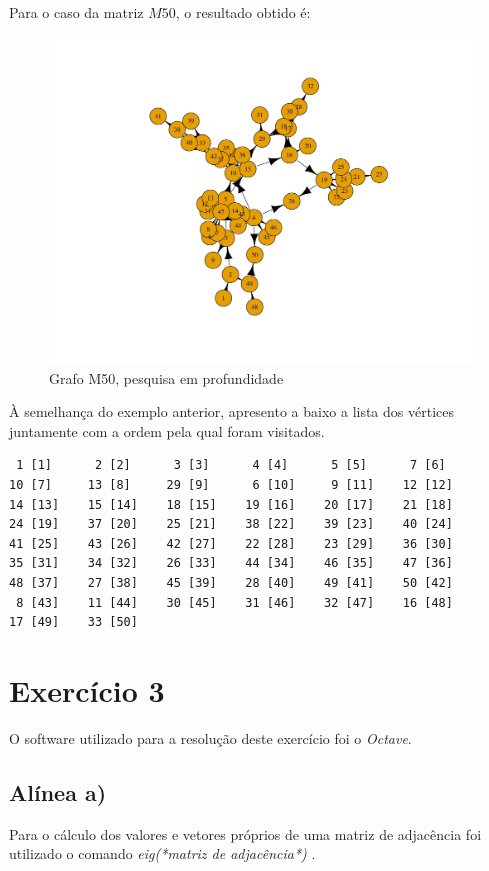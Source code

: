 \documentclass[a4paper,12pt]{report}
\begin{document}
Para o caso da matriz $M50$, o resultado obtido é:
\begin{figure}[H]
    \centering
        \includegraphics[scale=0.22]{img/dfsM50.pdf}
    \caption{Grafo M50, pesquisa em profundidade}
    \label{fig:dfsP}
\end{figure}

À semelhança do exemplo anterior, apresento a baixo a lista dos vértices juntamente com a ordem pela qual foram visitados.

\begin{lstlisting}
 1 [1]      2 [2]      3 [3]      4 [4]      5 [5]      7 [6]
10 [7]     13 [8]     29 [9]      6 [10]     9 [11]    12 [12]
14 [13]    15 [14]    18 [15]    19 [16]    20 [17]    21 [18]
24 [19]    37 [20]    25 [21]    38 [22]    39 [23]    40 [24]
41 [25]    43 [26]    42 [27]    22 [28]    23 [29]    36 [30]
35 [31]    34 [32]    26 [33]    44 [34]    46 [35]    47 [36]
48 [37]    27 [38]    45 [39]    28 [40]    49 [41]    50 [42]
 8 [43]    11 [44]    30 [45]    31 [46]    32 [47]    16 [48] 
17 [49]    33 [50] 
\end{lstlisting}


\section{Exercício 3}

O software utilizado para a resolução deste exercício foi o \textit{Octave}.

\subsection*{Alínea a)}
Para o cálculo dos valores e vetores próprios de uma matriz de adjacência foi utilizado o comando \textit{eig(*matriz de adjacência*)} \cite{WEBSITE1}.
\end{document}
